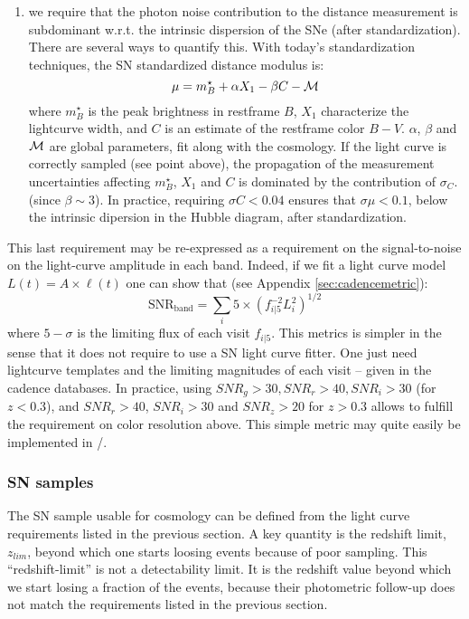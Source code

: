 \begin{enumerate}
\item we require that the photon noise contribution to the distance
  measurement is subdominant w.r.t. the intrinsic dispersion of the
  SNe (after standardization).  There are several ways to quantify
  this.  With today's standardization techniques, the SN standardized
  distance modulus is:
  \begin{equation}
    \mu = m^\star_B + \alpha X_1 - \beta C - \cal{M}
  \end{equation}
  where $m^\star_B$ is the peak brightness in restframe $B$, $X_1$
  characterize the lightcurve width, and $C$ is an estimate of the
  restframe color $B-V$. $\alpha$, $\beta$ and $\cal{M}$ are global
  parameters, fit along with the cosmology. If the light curve is
  correctly sampled (see point above), the propagation of the
  measurement uncertainties affecting $m^\star_B$, $X_1$ and $C$ is
  dominated by the contribution of $\sigma_C$. (since $\beta \sim
  3$). In practice, requiring $\sigma C < 0.04$ ensures that $\sigma
  \mu < 0.1$, below the intrinsic dipersion in the Hubble diagram,
  after standardization.
\end{enumerate}
This last requirement may be re-expressed as a requirement on the
signal-to-noise on the light-curve amplitude in each band. Indeed, if
we fit a light curve model $L(t) = A \times \ell(t)$ one can show
that (see Appendix \ref{sec:cadencemetric}):
\begin{equation}
\mathrm{SNR_{band}} = \sum_{i} 5 \times (f^{-2}_{i|5} L_i^2)^{1/2}\label{eqn:snr}
\end{equation} 
where $5-\sigma$ is the limiting flux of each visit $f_{i|5}$.  This
metrics is simpler in the sense that it does not require to use a SN
light curve fitter. One just need lightcurve templates and the
limiting magnitudes of each visit -- given in the cadence
databases. In practice, using $SNR_g > 30, SNR_r > 40, SNR_i > 30$
(for $z<0.3$), and $SNR_r > 40$, $SNR_i > 30$ and $SNR_z > 20$ for
$z>0.3$ allows to fulfill the requirement on color resolution above.
This simple metric may quite easily be implemented  in \opsim/\slair.

\subsubsection{SN samples}\label{sec:metrics}

The SN sample usable for cosmology can be defined from the light curve
requirements listed in the previous section. A key quantity is the
redshift limit, $z_{lim}$, beyond which one starts loosing events
because of poor sampling.  This ``redshift-limit'' is not a
detectability limit.  It is the redshift value beyond which we start
losing a fraction of the events, because their photometric follow-up
does not match the requirements listed in the previous section.

